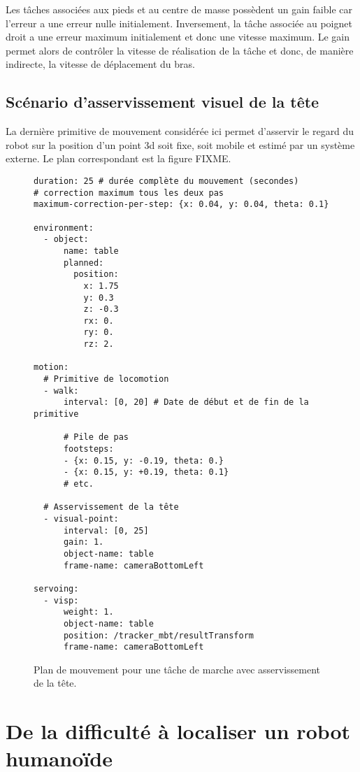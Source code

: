 Les tâches associées aux pieds et au centre de masse possèdent un gain
faible car l'erreur a une erreur nulle initialement. Inversement, la
tâche associée au poignet droit a une erreur maximum initialement et
donc une vitesse maximum. Le gain permet alors de contrôler la vitesse
de réalisation de la tâche et donc, de manière indirecte, la vitesse
de déplacement du bras.

\FloatBarrier

\subsection{Scénario d'asservissement visuel de la tête}

La dernière primitive de mouvement considérée ici permet d'asservir le
regard du robot sur la position d'un point 3d soit fixe, soit mobile
et estimé par un système externe. Le plan correspondant est la figure FIXME.

\begin{figure}
  \footnotesize
  \begin{center}
\begin{verbatim}
duration: 25 # durée complète du mouvement (secondes)
# correction maximum tous les deux pas
maximum-correction-per-step: {x: 0.04, y: 0.04, theta: 0.1}

environment:
  - object:
      name: table
      planned:
        position:
          x: 1.75
          y: 0.3
          z: -0.3
          rx: 0.
          ry: 0.
          rz: 2.

motion:
  # Primitive de locomotion
  - walk:
      interval: [0, 20] # Date de début et de fin de la primitive

      # Pile de pas
      footsteps:
      - {x: 0.15, y: -0.19, theta: 0.}
      - {x: 0.15, y: +0.19, theta: 0.1}
      # etc.

  # Asservissement de la tête
  - visual-point:
      interval: [0, 25]
      gain: 1.
      object-name: table
      frame-name: cameraBottomLeft

servoing:
  - visp:
      weight: 1.
      object-name: table
      position: /tracker_mbt/resultTransform
      frame-name: cameraBottomLeft
\end{verbatim}
  \end{center}
  \caption{Plan de mouvement pour une tâche de marche avec asservissement de la tête.}
\end{figure}

\FloatBarrier

\section{De la difficulté à localiser un robot humanoïde}
